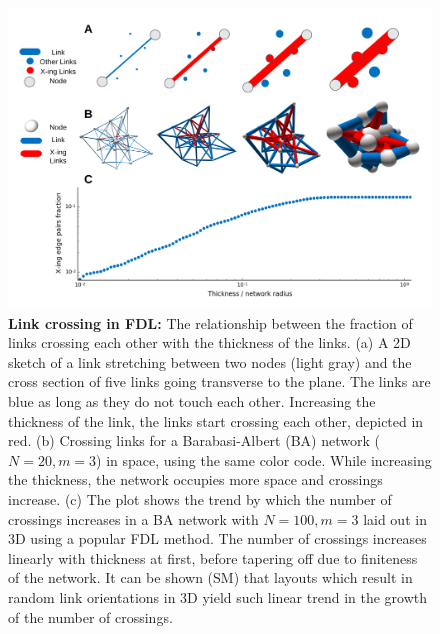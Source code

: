 \documentclass[nofootinbib,preprint,floatfix]{revtex4} %
\begin{document}
\begin{figure}
    \centering
    \includegraphics[width=1\columnwidth]{fig-09-19/panel-crs-2.png}
    \caption{{\bf Link crossing in FDL:} The relationship between the fraction of links crossing each other with the thickness of the links. (a) A 2D sketch of a link stretching between two nodes (light gray) and the cross section of five links going transverse to the plane. The links are blue as long as they do not touch each other. Increasing the thickness of the link, the links start crossing each other, depicted in red. (b)  Crossing links for a Barabasi-Albert (BA) network ($N = 20, m = 3$) in space, using the same color code. While increasing the thickness, the network occupies more space and crossings increase. (c) The plot shows the trend by which the number of crossings increases in a BA network with $N=100, m =3$ laid out in 3D using a popular FDL method. The number of crossings increases linearly with thickness at first, before tapering off due to finiteness of the network. It can be shown (SM) that layouts which result in random link orientations in 3D yield such linear trend in the growth of the number of crossings. }
    \label{fig:crossings}
\end{figure}
\end{document}

